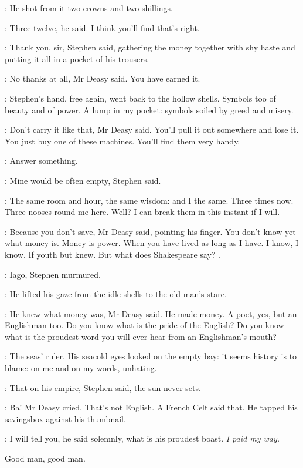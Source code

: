 :
He shot from it two crowns and two shillings.

\deasy:
Three twelve, he said. I think you'll find that's right.

\Stephen:
Thank you, sir, Stephen said, gathering the money together with shy
haste and putting it all in a pocket of his trousers.

\deasy:
No thanks at all, Mr Deasy said. You have earned it.

:
Stephen's hand, free again, went back to the hollow shells. Symbols
too of beauty and of power. A lump in my pocket: symbols soiled by greed
and misery.

\deasy:
Don't carry it like that, Mr Deasy said. You'll pull it out somewhere
and lose it. You just buy one of these machines. You'll find them very
handy.

\StephenInt:
Answer something.

\Stephen:
Mine would be often empty, Stephen said.

\StephenInt:
The same room and hour, the same wisdom: and I the same. Three
times now. Three nooses round me here. Well? I can break them in this
instant if I will.

\deasy:
Because you don't save, Mr Deasy said, pointing his finger. You don't
know yet what money is. Money is power. When you have lived as long as I
have. I know, I know. If youth but knew. But what does Shakespeare say?
.

\Stephen:
Iago, Stephen murmured.

:
He lifted his gaze from the idle shells to the old man's stare.

\deasy:
He knew what money was, Mr Deasy said. He made money. A poet, yes,
but an Englishman too. Do you know what is the pride of the English? Do
you know what is the proudest word you will ever hear from an
Englishman's mouth?

\StephenInt:
The seas' ruler. His seacold eyes looked on the empty bay: it seems
history is to blame: on me and on my words, unhating.

\Stephen:
That on his empire, Stephen said, the sun never sets.

\deasy:
Ba! Mr Deasy cried. That's not English. A French Celt said that. He
tapped his savingsbox against his thumbnail.

\deasy:
I will tell you, he said solemnly, what is his proudest boast.
\emph{I paid my way.}

Good man, good man.

